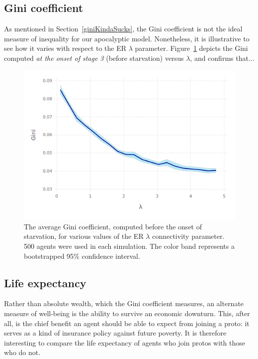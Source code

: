 
\subsection{Gini coefficient}

As mentioned in Section~\ref{giniKindaSucks}, the Gini coefficient is not the
ideal measure of inequality for our apocalyptic model. Nonetheless, it is
illustrative to see how it varies with respect to the ER $\lambda$ parameter.
Figure~\ref{fig:giniVsLambda} depicts the Gini computed \textit{at the onset
of stage 3} (before starvation) versus $\lambda$, and confirms that...

\begin{figure}[hb]
\centering
\includegraphics[width=\columnwidth]{figures/giniVsLambda.png}
\caption{The average Gini coefficient, computed before the onset of starvation,
for various values of the ER $\lambda$ connectivity parameter. 500 agents were
used in each simulation. The color band represents a bootstrapped 95\% confidence
interval.}
\label{fig:giniVsLambda}
\end{figure}


\subsection{Life expectancy}

Rather than absolute wealth, which the Gini coefficient measures, an alternate
measure of well-being is the ability to survive an economic downturn. This,
after all, is the chief benefit an agent should be able to expect from joining
a proto: it serves as a kind of insurance policy against future poverty. It is
therefore interesting to compare the life expectancy of agents who join protos
with those who do not.


